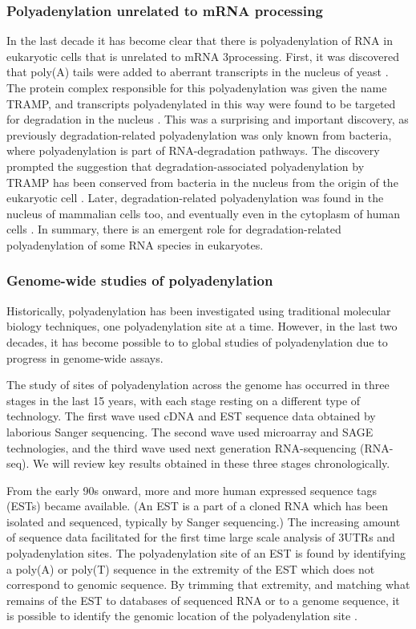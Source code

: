 \subsubsection{Polyadenylation unrelated to mRNA processing}
In the last decade it has become clear that there is polyadenylation of RNA in
eukaryotic cells that is unrelated to mRNA 3\ppp processing. First, it was
discovered that poly(A) tails were added to aberrant transcripts in the nucleus
of yeast \cite{wyers_cryptic_2005}. The protein complex responsible for this
polyadenylation was given the name TRAMP, and transcripts polyadenylated in
this way were found to be targeted for degradation in the nucleus
\cite{lacava_rna_2005, wyers_cryptic_2005}. This was a surprising and important
discovery, as previously degradation-related polyadenylation was only known
from bacteria, where polyadenylation is part of RNA-degradation pathways. The
discovery prompted the suggestion that degradation-associated polyadenylation
by TRAMP has been conserved from bacteria in the nucleus from the origin of the
eukaryotic cell \cite{lacava_rna_2005}. Later, degradation-related
polyadenylation was found in the nucleus of mammalian cells too, and eventually
even in the cytoplasm of human cells \cite{slomovic_polyadenylation_2006,
slomovic_addition_2010}. In summary, there is an emergent role for
degradation-related polyadenylation of some RNA species in eukaryotes.

\subsubsection{Genome-wide studies of polyadenylation}
Historically, polyadenylation has been investigated using traditional molecular
biology techniques, one polyadenylation site at a time. However, in the last two
decades, it has become possible to to global studies of polyadenylation due to
progress in genome-wide assays.

The study of sites of polyadenylation across the genome has occurred in three
stages in the last 15 years, with each stage resting on a different type of
technology. The first wave used cDNA and EST sequence data obtained by
laborious Sanger sequencing. The second wave used microarray and SAGE
technologies, and the third wave used next generation RNA-sequencing (RNA-seq).
We will review key results obtained in these three stages chronologically.

From the early 90s onward, more and more human expressed sequence tags (ESTs)
became available. (An EST is a part of a cloned RNA which has been isolated and
sequenced, typically by Sanger sequencing.) The increasing amount of sequence
data facilitated for the first time large scale analysis of 3\ppp UTRs and
polyadenylation sites. The polyadenylation site of an EST is found by
identifying a poly(A) or poly(T) sequence in the extremity of the EST which
does not correspond to genomic sequence. By trimming that extremity, and
matching what remains of the EST to databases of sequenced RNA or to a genome
sequence, it is possible to identify the genomic location of the
polyadenylation site \cite{beaudoing_patterns_2000, tian_large-scale_2005}.

